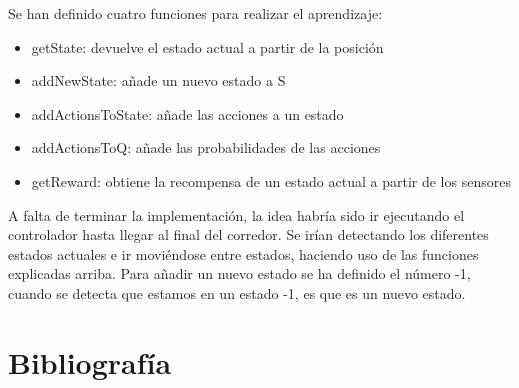 \documentclass[14pt]{extarticle}
\theoremstyle{definition}
\theoremstyle{remark}
\begin{document}
Se han definido cuatro funciones para realizar el aprendizaje:
\begin{itemize}
	\item getState: devuelve el estado actual a partir de la posición
	\item addNewState: añade un nuevo estado a S
	\item addActionsToState: añade las acciones a un estado
	\item addActionsToQ: añade las probabilidades de las acciones
	\item getReward: obtiene la recompensa de un estado actual a partir de los sensores
\end{itemize}

A falta de terminar la implementación, la idea habría sido ir ejecutando el controlador hasta llegar al final del corredor. Se irían detectando los diferentes estados actuales e ir moviéndose entre estados, haciendo uso de las funciones explicadas arriba. Para añadir un nuevo estado se ha definido el número -1, cuando se detecta que estamos en un estado -1, es que es un nuevo estado.

\newpage
\section{Bibliografía}\label{sec:bibliografia}


\end{document}
